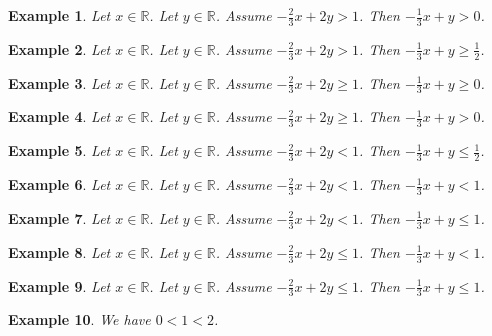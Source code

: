\documentclass{article}
\newtheorem{example}{Example}
\begin{document}
\begin{example}
Let $x\in\mathbb{R}$. Let $y\in\mathbb{R}$. Assume $-\frac{2}{3}x+2y>1$. Then $-\frac{1}{3}x+y>0$.
\end{example}

\begin{example}
Let $x\in\mathbb{R}$. Let $y\in\mathbb{R}$. Assume $-\frac{2}{3}x+2y>1$. Then $-\frac{1}{3}x+y\ge \frac{1}{2}$.
\end{example}

\begin{example}
Let $x\in\mathbb{R}$. Let $y\in\mathbb{R}$. Assume $-\frac{2}{3}x+2y\ge 1$. Then $-\frac{1}{3}x+y\ge 0$.
\end{example}

\begin{example}
Let $x\in\mathbb{R}$. Let $y\in\mathbb{R}$. Assume $-\frac{2}{3}x+2y\ge 1$. Then $-\frac{1}{3}x+y> 0$.
\end{example}

\begin{example}
Let $x\in\mathbb{R}$. Let $y\in\mathbb{R}$. Assume $-\frac{2}{3}x+2y<1$. Then $-\frac{1}{3}x+y\le \frac{1}{2}$.
\end{example}

\begin{example}
Let $x\in\mathbb{R}$. Let $y\in\mathbb{R}$. Assume $-\frac{2}{3}x+2y<1$. Then $-\frac{1}{3}x+y<1$.
\end{example}

\begin{example}
Let $x\in\mathbb{R}$. Let $y\in\mathbb{R}$. Assume $-\frac{2}{3}x+2y<1$. Then $-\frac{1}{3}x+y\le 1$.
\end{example}

\begin{example}
Let $x\in\mathbb{R}$. Let $y\in\mathbb{R}$. Assume $-\frac{2}{3}x+2y\le 1$. Then $-\frac{1}{3}x+y<1$.
\end{example}

\begin{example}
Let $x\in\mathbb{R}$. Let $y\in\mathbb{R}$. Assume $-\frac{2}{3}x+2y\le 1$. Then $-\frac{1}{3}x+y\le 1$.
\end{example}

\begin{example}
    We have $0<1<2$.
\end{example}
\end{document}
